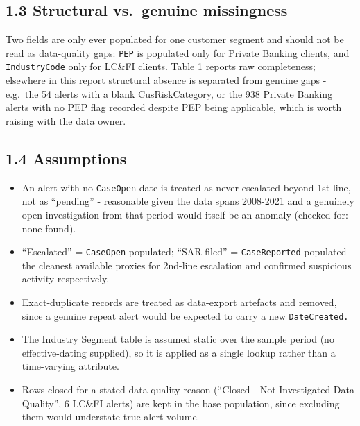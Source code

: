 \documentclass[
]{article}
\newcounter{none} %
\begin{document}
\subsection{1.3 Structural vs.~genuine
missingness}\label{structural-vs.-genuine-missingness}

Two fields are only ever populated for one customer segment and should
not be read as data-quality gaps: \texttt{PEP} is populated only for
Private Banking clients, and \texttt{IndustryCode} only for LC\&FI
clients. Table 1 reports raw completeness; elsewhere in this report
structural absence is separated from genuine gaps - e.g.~the 54 alerts
with a blank CusRiskCategory, or the 938 Private Banking alerts with no
PEP flag recorded despite PEP being applicable, which is worth raising
with the data owner.

\subsection{1.4 Assumptions}\label{assumptions}

\begin{itemize}
\item
  An alert with no \texttt{CaseOpen} date is treated as never escalated
  beyond 1st line, not as ``pending'' - reasonable given the data spans
  2008-2021 and a genuinely open investigation from that period would
  itself be an anomaly (checked for: none found).
\item
  ``Escalated'' = \texttt{CaseOpen} populated; ``SAR filed'' =
  \texttt{CaseReported} populated - the cleanest available proxies for
  2nd-line escalation and confirmed suspicious activity respectively.
\item
  Exact-duplicate records are treated as data-export artefacts and
  removed, since a genuine repeat alert would be expected to carry a new
  \texttt{DateCreated.}
\item
  The Industry Segment table is assumed static over the sample period
  (no effective-dating supplied), so it is applied as a single lookup
  rather than a time-varying attribute.
\item
  Rows closed for a stated data-quality reason (``Closed - Not
  Investigated Data Quality'', 6 LC\&FI alerts) are kept in the base
  population, since excluding them would understate true alert volume.
\end{itemize}
\end{document}
